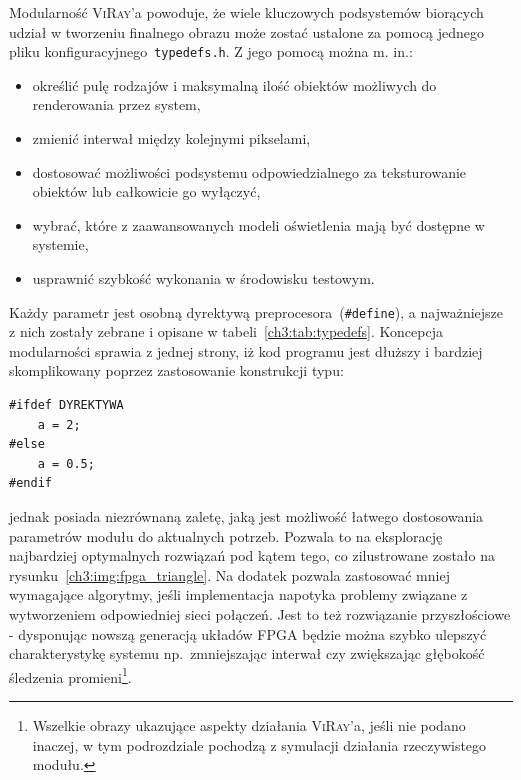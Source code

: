 Modularność \textsc{ViRay}'a powoduje, że wiele kluczowych podsystemów biorących udział w tworzeniu finalnego obrazu może zostać ustalone za pomocą jednego pliku konfiguracyjnego~\texttt{typedefs.h}. Z jego pomocą można m. in.:
\begin{itemize}
\item określić pulę rodzajów i maksymalną ilość obiektów możliwych do renderowania przez system,
\item zmienić interwał między kolejnymi pikselami,
\item dostosować możliwości podsystemu odpowiedzialnego za teksturowanie obiektów lub całkowicie go wyłączyć,
\item wybrać, które z zaawansowanych modeli oświetlenia mają być dostępne w systemie,
\item usprawnić szybkość wykonania w środowisku testowym.
\end{itemize}
Każdy parametr jest osobną dyrektywą preprocesora~(\texttt{\#define}), a najważniejsze z nich zostały zebrane i opisane w tabeli~\ref{ch3:tab:typedefs}. Koncepcja modularności sprawia z jednej strony, iż kod programu jest dłuższy i bardziej skomplikowany poprzez zastosowanie konstrukcji typu:
\begin{lstlisting}
#ifdef DYREKTYWA
	a = 2;
#else
	a = 0.5;
#endif
\end{lstlisting}
jednak posiada niezrównaną zaletę, jaką jest możliwość łatwego dostosowania parametrów modułu do aktualnych potrzeb. Pozwala to na eksplorację najbardziej optymalnych rozwiązań pod kątem tego, co zilustrowane zostało na rysunku~\ref{ch3:img:fpga_triangle}. Na dodatek pozwala zastosować mniej wymagające algorytmy, jeśli implementacja napotyka problemy związane z wytworzeniem odpowiedniej sieci połączeń. Jest to też rozwiązanie przyszłościowe - dysponując nowszą generacją układów FPGA będzie można szybko ulepszyć charakterystykę systemu np.~zmniejszając interwał czy zwiększając głębokość śledzenia promieni\footnote{Wszelkie obrazy ukazujące aspekty działania \textsc{ViRay}'a, jeśli nie podano inaczej, w tym podrozdziale pochodzą z symulacji działania rzeczywistego modułu.}.



